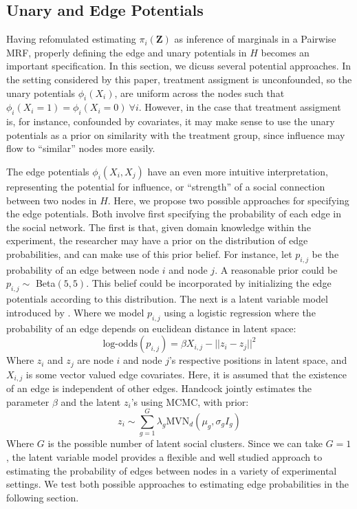 \documentclass{article}
\begin{document}


\subsection{Unary and Edge Potentials}

Having refomulated estimating $\pi_i(\mathbf{Z})$ as inference of marginals in a Pairwise MRF, 
properly defining the edge and unary potentials in $H$ becomes an important specification. In this section, 
we dicuss several potential approaches. In the setting considered by this paper, treatment assigment is unconfounded, so 
the unary potentials $\phi_i(X_i)$, are uniform across the nodes such that $\phi_i(X_i = 1) = \phi_i(X_i = 0) \ \forall i$. However, 
in the case that treatment assigment is, for instance, confounded by covariates, it may make sense to use the unary potentials as a prior on similarity 
with the treatment group, since influence may flow to ``similar'' nodes more easily. 

The edge potentials $\phi_i(X_i, X_j)$ have an even more intuitive interpretation, representing the potential for influence, or ``strength'' of a social connection between two nodes in $H$. Here, 
we propose two possible approaches for specifying the edge potentials. Both involve first specifying the probability of each edge in the social network. The first is that, given domain knowledge within the experiment, the researcher may have a prior on the distribution of 
edge probabilities, and can make use of this prior belief. For instance, let $p_{i,j}$ be the probability of an edge between node 
$i$ and node $j$. A reasonable prior could be $p_{i,j} \sim $ Beta$(5, 5)$. This belief could be incorporated by initializing the 
edge potentials according to this distribution. The next is a latent variable model introduced by \cite{Handcock}. Where we model $p_{i,j}$ using a logistic regression where the probability of an edge depends on euclidean distance in latent space: 
\begin{equation}
  \mbox{log-odds}(p_{i,j}) = \beta X_{i,j} - ||z_i - z_j||^2
\end{equation}
Where $z_i$ and $z_j$ are node $i$ and node $j$'s respective positions in latent space, and $X_{i,j}$ is some vector valued edge covariates. Here, it is assumed that the existence of an edge is independent of other edges. 
Handcock jointly estimates the parameter $\beta$ and the latent $z_i$'s using MCMC, with prior: \begin{displaymath}
  z_i \sim \sum_{g = 1}^{G}\lambda_g \mbox{MVN}_d(\mu_g, \sigma_gI_g) 
\end{displaymath}
Where $G$ is the possible number of latent social clusters. Since we can take $G = 1$, the latent variable model provides a flexible and well 
studied approach to estimating the probability of edges between nodes in a variety of experimental settings. We test both possible approaches to estimating 
edge probabilities in the following section.
\end{document}
